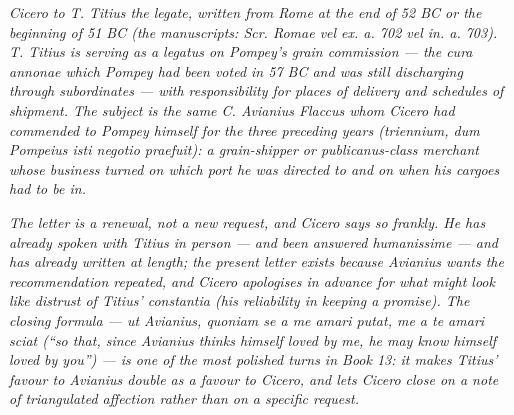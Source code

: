 
\textit{Cicero to T. Titius the legate, written from
Rome at the end of 52 BC or the beginning of 51 BC (the
manuscripts: \textit{Scr. Romae vel ex. a. 702 vel in.
a. 703}). T. Titius is serving as a \textit{legatus} on
Pompey's grain commission --- the \textit{cura
annonae} which Pompey had been voted in 57 BC and was
still discharging through subordinates --- with
responsibility for places of delivery and schedules of
shipment. The subject is the same C. Avianius Flaccus
whom Cicero had commended to Pompey himself for the
three preceding years (\textit{triennium, dum Pompeius
isti negotio praefuit}): a grain-shipper or
\textit{publicanus}-class merchant whose business
turned on which port he was directed to and on when
his cargoes had to be in.}

\textit{The letter is a renewal, not a new request,
and Cicero says so frankly. He has already spoken with
Titius in person --- and been answered \textit{humanissime}
--- and has already written at length; the present
letter exists because Avianius wants the recommendation
repeated, and Cicero apologises in advance for what
might look like distrust of Titius' \textit{constantia}
(his reliability in keeping a promise). The closing
formula --- \textit{ut Avianius, quoniam se a me amari
putat, me a te amari sciat} (``so that, since
Avianius thinks himself loved by me, he may know
himself loved by you'') --- is one of the most polished
turns in Book 13: it makes Titius' favour to Avianius
double as a favour to Cicero, and lets Cicero close on
a note of triangulated affection rather than on a
specific request.}
